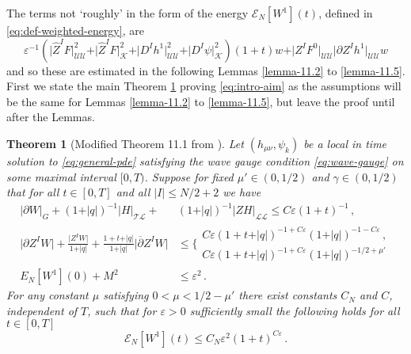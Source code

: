 \documentclass[11pt, a4paper]{amsart}
\numberwithin{equation}{section}
\newtheorem{theorem}{Theorem}
\numberwithin{theorem}{section}
\newcommand{\p}{\partial}
\newcommand{\mn}{{\mu \nu}}
\newcommand{\pgood}{\overline{\partial}}
\newcommand{\UU}{{\mathcal{U} \mathcal{U}}}
\newcommand{\LL}{{\mathcal{L} \mathcal{L}}}
\newcommand{\K}{\mathcal{K}}
\newcommand{\qv}{\vert q \vert}
\newcommand{\I}{\vert I \vert}
\begin{document}
The terms not `roughly' in the form of the energy $\mathcal{E}_N[W^1](t)$, defined in \eqref{eq:def-weighted-energy}, are 
\begin{equation}
 \varepsilon^{-1} ( \vert \hat{Z}^I F \vert^2_\UU + \vert \hat{Z}^I F \vert^2_\K + \vert D^I h^1 \vert^2_\UU + \vert D^I \psi \vert^2_\K ) (1+t)w + \vert Z^I F^0 \vert_\UU \vert \p Z^I h^1 \vert_\UU  w \label{eq:thm-11.1-terms-to-control}
\end{equation}
and so these are estimated in the following Lemmas \ref{lemma-11.2} to \ref{lemma-11.5}. First we state the main Theorem \ref{theorem-11.1} proving \eqref{eq:intro-aim} as the assumptions will be the same for Lemmas \ref{lemma-11.2} to \ref{lemma-11.5}, but leave the proof until after the Lemmas. 

\begin{theorem}[Modified Theorem 11.1 from \cite{LR:04}] \label{theorem-11.1}
Let $(h_\mn, \psi_k)$ be a local in time solution to \eqref{eq:general-pde} satisfying the wave gauge condition \eqref{eq:wave-gauge} on some maximal interval $[0, T)$. Suppose for fixed $\mu' \in (0, 1/2) $ and $\gamma \in (0,1/2)$ that for all $t \in [0,T]$ and all $\I \leq N/2 + 2$ we have
\begin{subequations}
\label{eq:thm-11.1-asmpt}
 \begin{align}
\vert \p W \vert_G + (1+\qv)^{-1} \vert H \vert_{\mathcal{T} \mathcal{L}} + &(1+\qv)^{-1} \vert Z H \vert_\LL  \leq C \varepsilon (1+t)^{-1} \label{eq:thm-11.1-assumpt1} \,, \\
\vert \p Z^I W \vert + \frac{\vert Z^I W \vert}{1+\qv} + \frac{1+t+\qv}{1+\qv} \vert \pgood Z^I W \vert & \leq \Big\lbrace \begin{array}{ll}
C\varepsilon (1+t+\qv)^{-1+C\varepsilon} (1+\qv)^{-1-C\varepsilon} \,, \\
C\varepsilon (1+t+\qv)^{-1+C\varepsilon} (1+\qv)^{-1/2+\mu'}
\end{array}  \label{eq:thm-11.1-assumpt2} \\
E_N[W^1](0) + M^2 & \leq \varepsilon^2 \,. \label{eq:thm-11.1-assumpt3} 
 \end{align}
\end{subequations}
For any constant $\mu$ satisfying $0<\mu<1/2-\mu'$ there exist constants $C_N$ and $C$, independent of $T$, such that for $\varepsilon>0$ sufficiently small the following holds for all $t \in [0, T]$
\begin{equation} \mathcal{E}_N[W^1](t) \leq C_N \varepsilon ^2 (1+t)^{C\varepsilon} \,. \end{equation}
\end{theorem}
\end{document}
